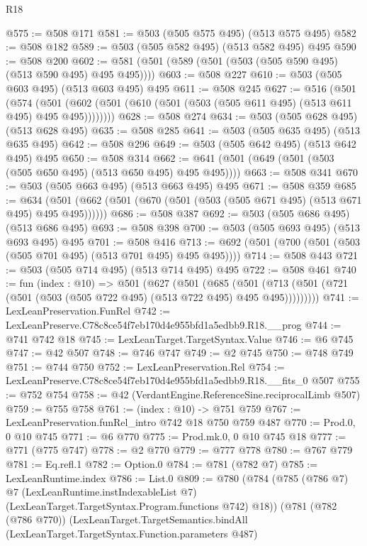 \begin{lexlean}{R18}
\begin{coremodule}
@575 := @508 @171
@581 := @503 (@505 @575 @495) (@513 @575 @495)
@582 := @508 @182
@589 := @503 (@505 @582 @495) (@513 @582 @495) @495
@590 := @508 @200
@602 := @581 (@501 (@589 (@501 (@503 (@505 @590 @495) (@513 @590 @495) @495 @495))))
@603 := @508 @227
@610 := @503 (@505 @603 @495) (@513 @603 @495) @495
@611 := @508 @245
@627 := @516
    (@501
      (@574 (@501 (@602 (@501 (@610 (@501 (@503 (@505 @611 @495) (@513 @611 @495) @495 @495))))))))
@628 := @508 @274
@634 := @503 (@505 @628 @495) (@513 @628 @495)
@635 := @508 @285
@641 := @503 (@505 @635 @495) (@513 @635 @495)
@642 := @508 @296
@649 := @503 (@505 @642 @495) (@513 @642 @495) @495
@650 := @508 @314
@662 := @641 (@501 (@649 (@501 (@503 (@505 @650 @495) (@513 @650 @495) @495 @495))))
@663 := @508 @341
@670 := @503 (@505 @663 @495) (@513 @663 @495) @495
@671 := @508 @359
@685 := @634 (@501 (@662 (@501 (@670 (@501 (@503 (@505 @671 @495) (@513 @671 @495) @495 @495))))))
@686 := @508 @387
@692 := @503 (@505 @686 @495) (@513 @686 @495)
@693 := @508 @398
@700 := @503 (@505 @693 @495) (@513 @693 @495) @495
@701 := @508 @416
@713 := @692 (@501 (@700 (@501 (@503 (@505 @701 @495) (@513 @701 @495) @495 @495))))
@714 := @508 @443
@721 := @503 (@505 @714 @495) (@513 @714 @495) @495
@722 := @508 @461
@740 := fun (index : @10) =>
  @501
    (@627
      (@501
        (@685
          (@501 (@713 (@501 (@721 (@501 (@503 (@505 @722 @495) (@513 @722 @495) @495 @495)))))))))
@741 := LexLeanPreservation.FunRel
@742 := LexLeanPreserve.C78c8ce54f7eb170d4e955bfd1a5edbb9.R18.__prog
@744 := @741 @742 @18
@745 := LexLeanTarget.TargetSyntax.Value
@746 := @6 @745
@747 := @42 @507
@748 := @746 @747
@749 := @2 @745
@750 := @748 @749
@751 := @744 @750
@752 := LexLeanPreservation.Rel
@754 := LexLeanPreserve.C78c8ce54f7eb170d4e955bfd1a5edbb9.R18.__fits_0 @507
@755 := @752 @754
@758 := @42 (VerdantEngine.ReferenceSine.reciprocalLimb @507)
@759 := @755 @758
@761 := (index : @10) -> @751 @759
@767 := LexLeanPreservation.funRel_intro @742 @18 @750 @759 @487
@770 := Prod.{0, 0} @10 @745
@771 := @6 @770
@775 := Prod.mk.{0, 0} @10 @745 @18
@777 := @771 (@775 @747)
@778 := @2 @770
@779 := @777 @778
@780 := @767 @779
@781 := Eq.refl.{1}
@782 := Option.{0}
@784 := @781 (@782 @7)
@785 := LexLeanRuntime.index
@786 := List.{0}
@809 := @780
    (@784
      (@785
        (@786 @7)
        @7
        (LexLeanRuntime.instIndexableList @7)
        (LexLeanTarget.TargetSyntax.Program.functions @742)
        @18))
    (@781
      (@782 (@786 @770))
      (LexLeanTarget.TargetSemantics.bindAll
        (LexLeanTarget.TargetSyntax.Function.parameters @487)

\end{coremodule}
\end{lexlean}
